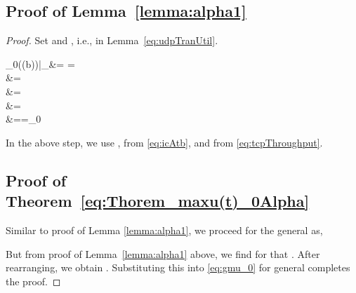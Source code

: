 \documentclass{IEEEtran}
\begin{document}
      \subsection*{Proof of Lemma~\ref{lemma:alpha1}}
      \vspace{3mm}
     \begin{proof}
    Set  and , i.e.,  in Lemma~\ref{eq:udpTranUtil}.
    
        \mu_0(\tau(b))|_{}&= = \nonumber \\
        &= \label{subeqn1} \\
        &= \label{subeqn2} \\
        &= \label{subeqn3} \\
       &==\mu_0  \label{subeqn4}
    
    In the above step, we use ,  from \eqref{eq:icAtb}, and  from \eqref{eq:tcpThroughput}.
    \subsection*{Proof of Theorem~\ref{eq:Thorem_maxu(t)_0Alpha}}
    Similar to proof of Lemma \ref{lemma:alpha1}, we proceed for the general  as,
    
    But from proof of Lemma~\ref{lemma:alpha1} above, we find for  that . After rearranging,  we obtain . Substituting this into \eqref{eq:gmu_0} for general  completes the proof.
    \end{proof}
\end{document}

